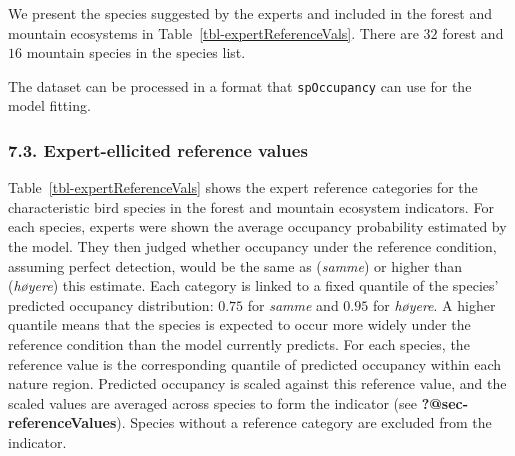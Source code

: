 \documentclass[
  letterpaper,
  DIV=11,
  numbers=noendperiod]{scrartcl}
\begin{document}
We present the species suggested by the experts and included in the
forest and mountain ecosystems in Table~\ref{tbl-expertReferenceVals}.
There are \(32\) forest and \(16\) mountain species in the species list.

The dataset can be processed in a format that \texttt{spOccupancy} can
use for the model fitting.

\subsubsection{7.3. Expert-ellicited reference
values}\label{expert-ellicited-reference-values}

Table~\ref{tbl-expertReferenceVals} shows the expert reference
categories for the characteristic bird species in the forest and
mountain ecosystem indicators. For each species, experts were shown the
average occupancy probability estimated by the model. They then judged
whether occupancy under the reference condition, assuming perfect
detection, would be the same as (\emph{samme}) or higher than
(\emph{høyere}) this estimate. Each category is linked to a fixed
quantile of the species' predicted occupancy distribution: \(0.75\) for
\emph{samme} and \(0.95\) for \emph{høyere}. A higher quantile means
that the species is expected to occur more widely under the reference
condition than the model currently predicts. For each species, the
reference value is the corresponding quantile of predicted occupancy
within each nature region. Predicted occupancy is scaled against this
reference value, and the scaled values are averaged across species to
form the indicator (see \textbf{?@sec-referenceValues}). Species without
a reference category are excluded from the indicator.
\end{document}
